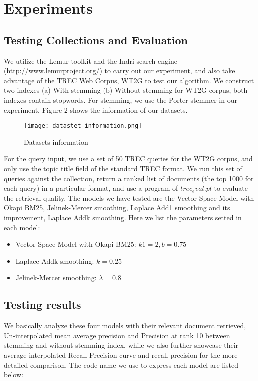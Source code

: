 \documentclass{article}
\begin{document}
\section{Experiments}
\subsection{Testing Collections and Evaluation}
We utilize the Lemur toolkit and the Indri search engine (\href{http://www.lemurproject.org/}{http://www.lemurproject.org/}) to carry out our experiment, and also take advantage of the TREC Web Corpus, WT2G to test our algorithm. We construct two indexes (a) With stemming (b) Without stemming for WT2G corpus, both indexes contain stopwords. For stemming, we use the Porter stemmer in our experiment, Figure 2 shows the information of our datasets. 

\begin{figure}[htp]
    \centering
    \texttt{[image: datastet\_information.png]}
    \caption{Datasets information}
\end{figure}

For the query input, we use a set of 50 TREC queries for the WT2G corpus, and only use the topic title field of the standard TREC format. We run this set of queries against the collection, return a ranked list of documents (the top 1000 for each query) in a particular format, and use a program of $trec_eval.pl$ to evaluate the retrieval quality. The models we have tested are the Vector Space Model with Okapi BM25, Jelinek-Mercer smoothing, Laplace Add1 smoothing and its improvement, Laplace Addk smoothing. Here we list the parameters setted in each model:

\begin{itemize}
    \item Vector Space Model with Okapi BM25: $k1 = 2, b = 0.75$
    \item Laplace Addk smoothing: $k = 0.25$
    \item Jelinek-Mercer smoothing: $\lambda = 0.8$
\end{itemize}

\subsection{Testing results}
We basically analyze these four models with their relevant document retrieved, Un-interpolated mean average precision and Precision at rank 10 between stemming and without-stemming index, while we also further showcase their average interpolated Recall-Precision curve and recall precision for the more detailed comparison. The code name we use to express each model are listed below:
\end{document}
